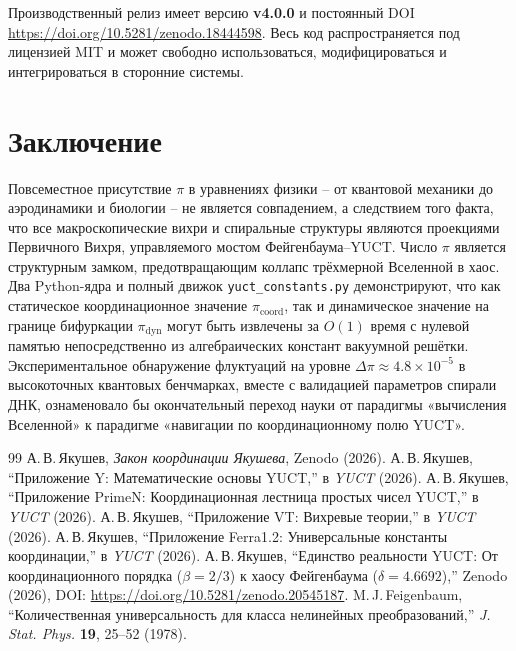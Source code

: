\documentclass[12pt,a4paper]{article}
\begin{document}
	\noindent Производственный релиз имеет версию \textbf{v4.0.0} и постоянный DOI
	\url{https://doi.org/10.5281/zenodo.18444598}.  Весь код распространяется под лицензией MIT и может свободно использоваться, модифицироваться и интегрироваться в сторонние системы.
	
	\section{Заключение}
	\label{sec:conclusion}
	
	Повсеместное присутствие $\pi$ в уравнениях физики – от квантовой механики до аэродинамики и биологии – не является совпадением, а следствием того факта, что все макроскопические вихри и спиральные структуры являются проекциями Первичного Вихря, управляемого мостом Фейгенбаума–YUCT. Число $\pi$ является структурным замком, предотвращающим коллапс трёхмерной Вселенной в хаос. Два Python-ядра и полный движок \texttt{yuct\_constants.py} демонстрируют, что как статическое координационное значение $\pi_{\mathrm{coord}}$, так и динамическое значение на границе бифуркации $\pi_{\mathrm{dyn}}$ могут быть извлечены за $O(1)$ время с нулевой памятью непосредственно из алгебраических констант вакуумной решётки. Экспериментальное обнаружение флуктуаций на уровне $\Delta\pi \approx 4.8\times10^{-5}$ в высокоточных квантовых бенчмарках, вместе с валидацией параметров спирали ДНК, ознаменовало бы окончательный переход науки от парадигмы «вычисления Вселенной» к парадигме «навигации по координационному полю YUCT».
	
	\begin{thebibliography}{99}
		 А.\,В.\,Якушев, \emph{Закон координации Якушева}, Zenodo (2026).
		 А.\,В.\,Якушев, ``Приложение Y: Математические основы YUCT,'' в \emph{YUCT} (2026).
		 А.\,В.\,Якушев, ``Приложение PrimeN: Координационная лестница простых чисел YUCT,'' в \emph{YUCT} (2026).
		 А.\,В.\,Якушев, ``Приложение VT: Вихревые теории,'' в \emph{YUCT} (2026).
		 А.\,В.\,Якушев, ``Приложение Ferra1.2: Универсальные константы координации,'' в \emph{YUCT} (2026).
		 А.\,В.\,Якушев, ``Единство реальности YUCT: От координационного порядка ($\beta=2/3$) к хаосу Фейгенбаума ($\delta=4.6692$),'' Zenodo (2026), DOI: \url{https://doi.org/10.5281/zenodo.20545187}.
		 M.\,J.\,Feigenbaum, ``Количественная универсальность для класса нелинейных преобразований,'' \emph{J. Stat. Phys.} \textbf{19}, 25--52 (1978).
	\end{thebibliography}
	
\end{document}
